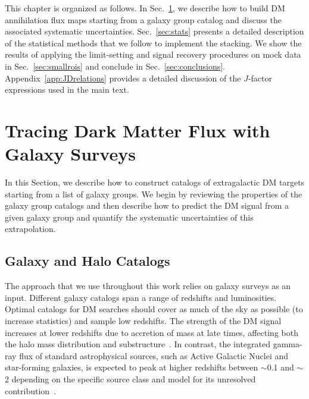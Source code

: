 This chapter is organized as follows. In Sec.~\ref{sec:galaxyfilteringpipeline}, we describe how to build DM annihilation flux maps starting from a galaxy group catalog and discuss the associated systematic uncertainties.  Sec.~\ref{sec:stats} presents a detailed description of the statistical methods that we follow to implement the stacking. We show the results of applying the limit-setting and signal recovery procedures on mock data in Sec.~\ref{sec:smallrois} and conclude in Sec.~\ref{sec:conclusions}.  Appendix~\ref{app:JDrelations} provides a  detailed discussion of the $J$-factor expressions used in the main text.  %

\section{Tracing Dark Matter Flux with Galaxy Surveys}
\label{sec:galaxyfilteringpipeline}

In this Section, we describe how to construct catalogs of extragalactic DM targets starting from a list of galaxy groups.  We begin by reviewing the properties of the galaxy group catalogs and then describe how to predict the DM signal from a given galaxy group and quantify the systematic uncertainties of this extrapolation.  

\subsection{Galaxy and Halo Catalogs}

The approach that we use throughout this work relies on galaxy surveys as an input.  Different galaxy catalogs span a range of redshifts and luminosities. Optimal catalogs for DM searches should cover as much of the sky as possible (to increase statistics) and sample low redshifts.  The strength of the DM signal increases at lower redshifts due to accretion of mass at late times, affecting both the halo mass distribution and substructure~\cite{Ando:2014aoa}.  In contrast, the integrated gamma-ray flux of standard astrophysical sources, such as Active Galactic Nuclei and star-forming galaxies, is expected to peak at higher redshifts between $\sim$0.1 and $\sim$2 depending on the specific source class and model for its unresolved contribution~\cite{Ando:2014aoa, Xia:2015wka}.  

